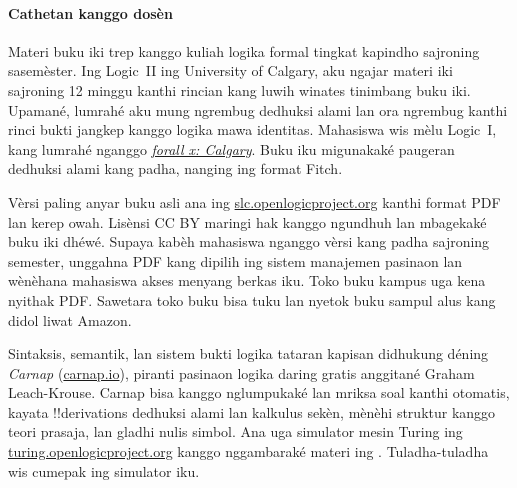 \paragraph{Cathetan kanggo dosèn}
Materi buku iki trep kanggo kuliah logika formal tingkat kapindho
sajroning sasemèster. Ing Logic~II ing University of Calgary, aku
ngajar materi iki sajroning 12 minggu kanthi rincian kang luwih
winates tinimbang buku iki. Upamané, lumrahé aku mung ngrembug
dedhuksi alami lan ora ngrembug kanthi rinci bukti jangkep kanggo
logika mawa identitas. Mahasiswa wis mèlu Logic~I, kang lumrahé
nganggo \emph{\href{https://forallx.openlogicproject.org}{forall x:
Calgary}}. Buku iku migunakaké paugeran dedhuksi alami kang padha,
nanging ing format Fitch.

Vèrsi paling anyar buku asli ana ing
\href{https://slc.openlogicproject.org}{slc.openlogicproject.org}
kanthi format PDF lan kerep owah. Lisènsi CC BY maringi hak kanggo
ngundhuh lan mbagekaké buku iki dhéwé. Supaya kabèh mahasiswa nganggo
vèrsi kang padha sajroning semester, unggahna PDF kang dipilih ing
sistem manajemen pasinaon lan wènèhana mahasiswa akses menyang berkas
iku. Toko buku kampus uga kena nyithak PDF. Sawetara toko buku bisa
tuku lan nyetok buku sampul alus kang didol liwat Amazon.

Sintaksis, semantik, lan sistem bukti logika tataran kapisan didhukung
déning \emph{Carnap} (\href{https://carnap.io}{carnap.io}), piranti
pasinaon logika daring gratis anggitané Graham Leach-Krouse. Carnap
bisa kanggo nglumpukaké lan mriksa soal kanthi otomatis, kayata
!!{derivation}s dedhuksi alami lan kalkulus sekèn, mènèhi struktur
kanggo teori prasaja, lan gladhi nulis simbol. Ana uga simulator mesin
Turing ing \href{https://turing.openlogicproject.org}{turing.openlogicproject.org}
kanggo nggambaraké materi ing . Tuladha-tuladha
wis cumepak ing simulator iku.
